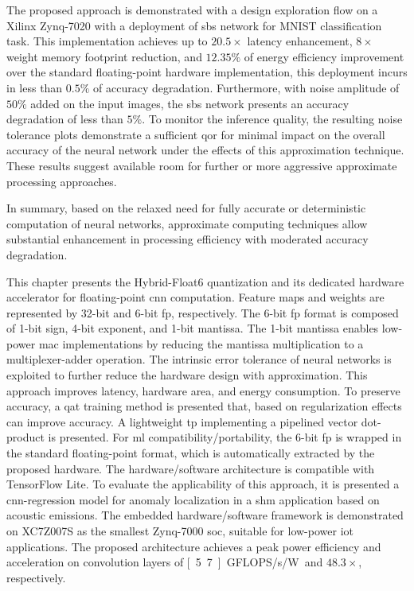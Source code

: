 The proposed approach is demonstrated with a design exploration flow on a Xilinx Zynq-7020 with a deployment of \gls{sbs} network for MNIST classification task. This implementation achieves up to $20.5\times$ latency enhancement, $8\times$ weight memory footprint reduction, and $12.35\%$ of energy efficiency improvement over the standard floating-point hardware implementation, this deployment incurs in less than $0.5\%$ of accuracy degradation. Furthermore, with noise amplitude of $50\%$ added on the input images, the \gls{sbs} network presents an accuracy degradation of less than $5\%$. To monitor the inference quality, the resulting noise tolerance plots demonstrate a sufficient \gls{qor} for minimal impact on the overall accuracy of the neural network under the effects of this approximation technique. These results suggest available room for further or more aggressive approximate processing approaches.


In summary, based on the relaxed need for fully accurate or deterministic computation of neural networks, approximate computing techniques allow substantial enhancement in processing efficiency with moderated accuracy degradation.

This chapter presents the Hybrid-Float6 quantization and its dedicated hardware accelerator for floating-point \gls{cnn} computation. Feature maps and weights are represented by 32-bit and 6-bit \gls{fp}, respectively. The 6-bit \gls{fp} format is composed of 1-bit sign, 4-bit exponent, and 1-bit mantissa. The 1-bit mantissa enables low-power \gls{mac} implementations by reducing the mantissa multiplication to a multiplexer-adder operation. The intrinsic error tolerance of neural networks is exploited to further reduce the hardware design with approximation. This approach improves latency, hardware area, and energy consumption. To preserve accuracy, a \gls{qat} training method is presented that, based on regularization effects can improve accuracy. A lightweight \gls{tp} implementing a pipelined vector dot-product is presented. For \gls{ml} compatibility/portability, the 6-bit \gls{fp} is wrapped in the standard floating-point format, which is automatically extracted by the proposed hardware. The hardware/software architecture is compatible with TensorFlow Lite. To evaluate the applicability of this approach, it is presented a \gls{cnn}-regression model for anomaly localization in a \gls{shm} application based on acoustic emissions. The embedded hardware/software framework is demonstrated on XC7Z007S as the smallest Zynq-7000 \gls{soc}, suitable for low-power \gls{iot} applications. The proposed architecture achieves a peak power efficiency and acceleration on convolution layers of \unit[5.7]{GFLOPS/s/W} and $48.3\times$, respectively.


